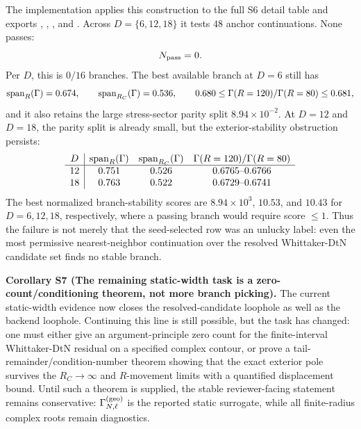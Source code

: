 \documentclass[aps,prd,onecolumn,notitlepage,nofootinbib,superscriptaddress,11pt,floatfix]{revtex4-2}
\begin{document}
The implementation  applies this construction to the full S6 detail table and exports , , , and .  Across \(D=\{6,12,18\}\) it tests \(48\) anchor continuations.  None passes:
\[
N_{\rm pass}=0 .
\]
Per \(D\), this is \(0/16\) branches.  The best available branch at \(D=6\) still has
\[
{\rm span}_R(\Gamma)=0.674,\qquad
{\rm span}_{R_C}(\Gamma)=0.536,\qquad
0.680\leq\Gamma(R=120)/\Gamma(R=80)\leq0.681,
\]
and it also retains the large stress-sector parity split \(8.94\times10^{-2}\).  At \(D=12\) and \(D=18\), the parity split is already small, but the exterior-stability obstruction persists:
\[
\begin{array}{c|ccc}
D & {\rm span}_R(\Gamma) & {\rm span}_{R_C}(\Gamma) &
\Gamma(R=120)/\Gamma(R=80)\\
\hline
12 & 0.751 & 0.526 & 0.6765\text{--}0.6766\\
18 & 0.763 & 0.522 & 0.6729\text{--}0.6741
\end{array}
\]
The best normalized branch-stability scores are \(8.94\times10^3\), \(10.53\), and \(10.43\) for \(D=6,12,18\), respectively, where a passing branch would require score \(\le1\).  Thus the failure is not merely that the seed-selected row was an unlucky label: even the most permissive nearest-neighbor continuation over the resolved Whittaker-DtN candidate set finds no stable branch.

\medskip\noindent\textbf{Corollary S7 (The remaining static-width task is a zero-count/conditioning theorem, not more branch picking).}
The current static-width evidence now closes the resolved-candidate loophole as well as the backend loophole.  Continuing this line is still possible, but the task has changed: one must either give an argument-principle zero count for the finite-interval Whittaker-DtN residual on a specified complex contour, or prove a tail-remainder/condition-number theorem showing that the exact exterior pole survives the \(R_C\to\infty\) and \(R\)-movement limits with a quantified displacement bound.  Until such a theorem is supplied, the stable reviewer-facing statement remains conservative: \(\Gamma_{N,\ell}^{\rm(geo)}\) is the reported static surrogate, while all finite-radius complex roots remain diagnostics.
\end{document}

